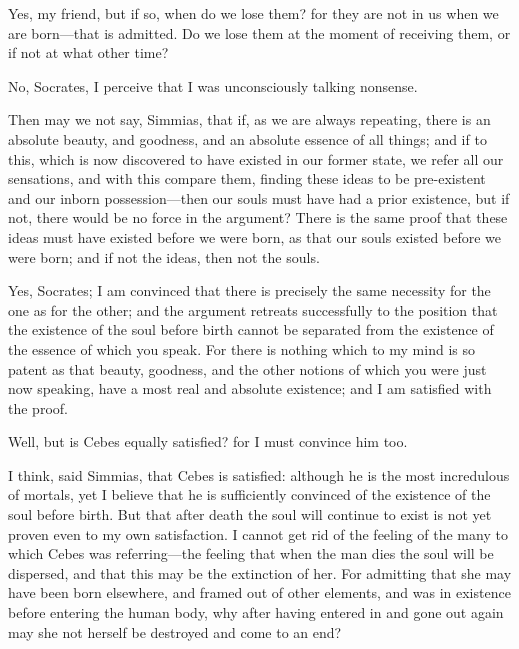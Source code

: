 \documentclass[11pt,letter]{article}
\begin{document}
\par  Yes, my friend, but if so, when do we lose them? for they are not in us when we are born—that is admitted. Do we lose them at the moment of receiving them, or if not at what other time?

\par  No, Socrates, I perceive that I was unconsciously talking nonsense.

\par  Then may we not say, Simmias, that if, as we are always repeating, there is an absolute beauty, and goodness, and an absolute essence of all things; and if to this, which is now discovered to have existed in our former state, we refer all our sensations, and with this compare them, finding these ideas to be pre-existent and our inborn possession—then our souls must have had a prior existence, but if not, there would be no force in the argument? There is the same proof that these ideas must have existed before we were born, as that our souls existed before we were born; and if not the ideas, then not the souls.

\par  Yes, Socrates; I am convinced that there is precisely the same necessity for the one as for the other; and the argument retreats successfully to the position that the existence of the soul before birth cannot be separated from the existence of the essence of which you speak. For there is nothing which to my mind is so patent as that beauty, goodness, and the other notions of which you were just now speaking, have a most real and absolute existence; and I am satisfied with the proof.

\par  Well, but is Cebes equally satisfied? for I must convince him too.

\par  I think, said Simmias, that Cebes is satisfied: although he is the most incredulous of mortals, yet I believe that he is sufficiently convinced of the existence of the soul before birth. But that after death the soul will continue to exist is not yet proven even to my own satisfaction. I cannot get rid of the feeling of the many to which Cebes was referring—the feeling that when the man dies the soul will be dispersed, and that this may be the extinction of her. For admitting that she may have been born elsewhere, and framed out of other elements, and was in existence before entering the human body, why after having entered in and gone out again may she not herself be destroyed and come to an end?
\end{document}
